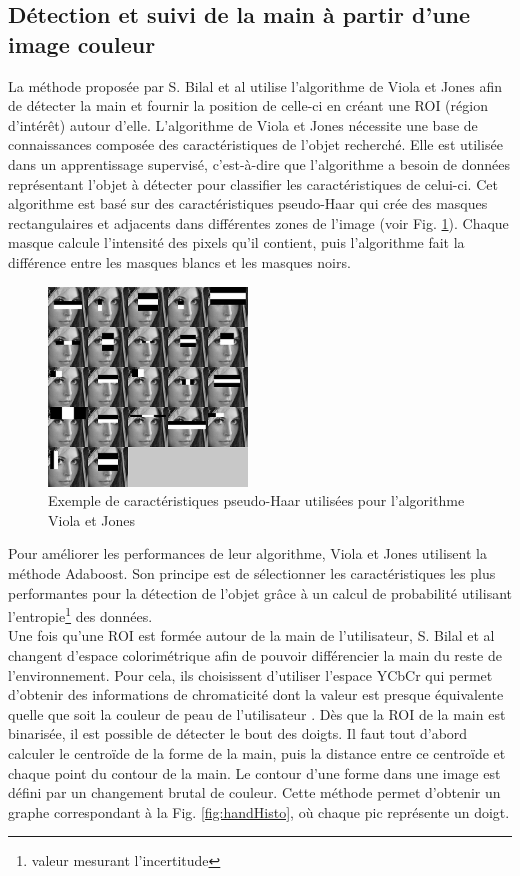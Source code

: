 \subsection{Détection et suivi de la main à partir d'une image couleur}
La méthode proposée par S. Bilal et al \cite{haarlike} utilise l'algorithme de Viola et Jones \cite{viola2001jones} afin
de détecter la main et fournir la position de celle-ci en créant une ROI (région d'intérêt) autour d'elle.
L'algorithme de Viola et Jones \cite{viola2001jones} nécessite une
base de connaissances composée des caractéristiques de l'objet recherché. Elle est utilisée dans un
apprentissage supervisé, c'est-à-dire que l'algorithme a besoin de données représentant
l'objet à détecter pour classifier les caractéristiques de celui-ci. Cet algorithme est basé sur des caractéristiques
pseudo-Haar qui crée des masques rectangulaires et adjacents dans différentes zones de l'image (voir Fig. \ref{fig:pseudo_haar}).
Chaque masque calcule l'intensité des pixels qu'il contient, puis l'algorithme fait la différence entre les masques blancs et
les masques noirs.\\

\begin{figure}[!h]
\center
\includegraphics[width=200px]{images/pseudoHaar.jpg}
\caption{Exemple de caractéristiques pseudo-Haar utilisées pour l'algorithme Viola et Jones}
\label{fig:pseudo_haar}
\end{figure}

Pour améliorer les performances de leur algorithme, Viola et Jones utilisent la méthode Adaboost. Son
principe est de sélectionner les caractéristiques les plus performantes pour la détection de l'objet grâce à
un calcul de probabilité utilisant l'entropie\footnote{valeur mesurant l'incertitude} des données.\\

Une fois qu'une ROI est formée autour de la main de l'utilisateur, S. Bilal et al \cite{haarlike} changent d'espace colorimétrique
afin de pouvoir différencier la main du reste de l'environnement. Pour cela, ils choisissent
d'utiliser l'espace YCbCr qui permet d'obtenir des informations de chromaticité dont la valeur est presque équivalente
quelle que soit la couleur de peau de l'utilisateur \cite{yoo1999fast}. Dès que la ROI de la main est binarisée, il est possible
de détecter le bout des doigts. Il faut tout d'abord calculer le centroïde de la forme de la main, puis la distance entre
ce centroïde et chaque point du contour de la main. Le contour d'une forme dans une image est défini par un changement brutal
de couleur. Cette méthode permet d'obtenir un graphe correspondant à la Fig. \ref{fig:handHisto}, où chaque pic représente un doigt.\\

